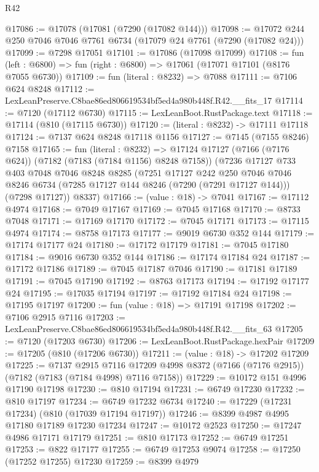 \begin{lexlean}{R42}
\begin{coremodule}
{@17086 := @17078 (@17081 (@7290 (@17082 @144)))
@17098 := @17072 @244 @250 @7046 @7046 @7761 @6734 (@17079 @24 @7761 (@7290 (@17082 @24)))
@17099 := @7298 @17051
@17101 := @17086 (@17098 @17099)
@17108 := fun (left : @6800) => fun (right : @6800) => @17061 (@17071 @17101 (@8176 @7055 @6730))
@17109 := fun (literal : @8232) => @7088
@17111 := @7106 @624 @8248
@17112 := LexLeanPreserve.C8bae86ed806619534bf5ed4a980b448f.R42.__fits_17
@17114 := @7120 (@17112 @6730)
@17115 := LexLeanBoot.RustPackage.text
@17118 := @17114 (@810 (@17115 @6730))
@17120 := (literal : @8232) -> @17111 @17118
@17124 := @7137 @624 @8248 @17118 @1156
@17127 := @7145 (@7155 @8246) @7158
@17165 := fun (literal : @8232) =>
  @17124
    @17127
    (@7166 (@7176 @624))
    (@7182 (@7183 (@7184 @1156) @8248 @7158))
    (@7236
      @17127
      @733
      @403
      @7048
      @7046
      @8248
      @8285
      (@7251
        @17127
        @242
        @250
        @7046
        @7046
        @8246
        @6734
        (@7285 @17127 @144 @8246 (@7290 (@7291 @17127 @144)))
        (@7298 @17127))
      @8337)
@17166 := (value : @18) -> @7041
@17167 := @17112 @4974
@17168 := @7049 @17167
@17169 := @7045 @17168
@17170 := @8733 @7048
@17171 := @17169 @17170
@17172 := @7045 @17171
@17173 := @17115 @4974
@17174 := @8758 @17173
@17177 := @9019 @6730 @352 @144
@17179 := @17174 @17177 @24
@17180 := @17172 @17179
@17181 := @7045 @17180
@17184 := @9016 @6730 @352 @144
@17186 := @17174 @17184 @24
@17187 := @17172 @17186
@17189 := @7045 @17187 @7046
@17190 := @17181 @17189
@17191 := @7045 @17190
@17192 := @8763 @17173
@17194 := @17192 @17177 @24
@17195 := @17035 @17194
@17197 := @17192 @17184 @24
@17198 := @17195 @17197
@17200 := fun (value : @18) => @17191 @17198
@17202 := @7106 @2915 @7116
@17203 := LexLeanPreserve.C8bae86ed806619534bf5ed4a980b448f.R42.__fits_63
@17205 := @7120 (@17203 @6730)
@17206 := LexLeanBoot.RustPackage.hexPair
@17209 := @17205 (@810 (@17206 @6730))
@17211 := (value : @18) -> @17202 @17209
@17225 := @7137
    @2915
    @7116
    @17209
    @4998
    @8372
    (@7166 (@7176 @2915))
    (@7182 (@7183 (@7184 @4998) @7116 @7158))
@17229 := @10172 @151 @4996 @17190 @17198
@17230 := @810 @17194
@17231 := @6749 @17230
@17232 := @810 @17197
@17234 := @6749 @17232 @6734
@17240 := @17229 (@17231 @17234) (@810 (@17039 @17194 @17197))
@17246 := @8399 @4987 @4995 @17180 @17189 @17230 @17234
@17247 := @10172 @2523
@17250 := @17247 @4986 @17171 @17179
@17251 := @810 @17173
@17252 := @6749 @17251
@17253 := @822 @17177
@17255 := @6749 @17253 @9074
@17258 := @17250 (@17252 @17255) @17230
@17259 := @8399 @4979
}
\end{coremodule}
\end{lexlean}
